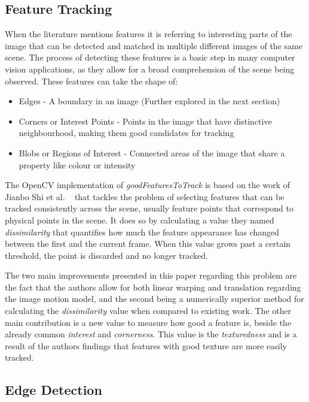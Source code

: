 
\subsection{Feature Tracking}

When the literature mentions features it is referring to interesting parts of the image that can be detected and matched in multiple different images of the same scene. The process of detecting these features is a basic step in many computer vision applications, as they allow for a broad comprehension of the scene being observed. These features can take the shape of:

\begin{itemize}
	\item Edges - A boundary in an image (Further explored in the next section)
	\item Corners or Interest Points - Points in the image that have distinctive neighbourhood, making them good candidates for tracking
	\item Blobs or Regions of Interest - Connected areas of the image that share a property like colour or intensity
\end{itemize}

The OpenCV implementation of \textit{goodFeaturesToTrack} is based on the work of Jianbo Shi et al. ~\cite{shi_good_1994} that tackles the problem of selecting features that can be tracked consistently across the scene, usually feature points that correspond to physical points in the scene. It does so by calculating a value they named \textit{dissimilarity} that quantifies how much the feature appearance has changed between the first and the current frame. When this value grows past a certain threshold, the point is discarded and no longer tracked.

The two main improvements presented in this paper regarding this problem are the fact that the authors allow for both linear warping and translation regarding the image motion model, and the second being a numerically superior method for calculating the \textit{dissimilarity} value when compared to existing work. The other main contribution is a new value to measure how good a feature is, beside the already common \textit{interest} and \textit{cornerness}. This value is the \textit{texturedness} and is a result of the authors findings that features with good texture are more easily tracked.

\subsection{Edge Detection}

